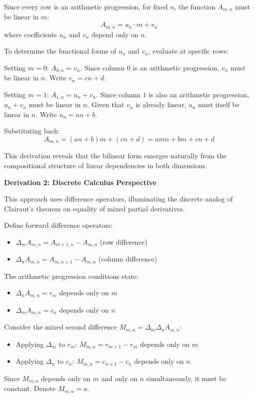 \begin{enumerate}
 Since every row is an arithmetic progression, for fixed $n$, the function $A_{m,n}$ must be linear in $m$:
 \[A_{m,n} = u_n \cdot m + v_n\]where coefficients $u_n$ and $v_n$ depend only on $n$.

 To determine the functional forms of $u_n$ and $v_n$, evaluate at specific rows:

 Setting $m = 0$: $A_{0,n} = v_n$. Since column $0$ is an arithmetic progression, $v_n$ must be linear in $n$. Write $v_n = cn + d$.

 Setting $m = 1$: $A_{1,n} = u_n + v_n$. Since column $1$ is also an arithmetic progression, $u_n + v_n$ must be linear in $n$. Given that $v_n$ is already linear, $u_n$ must itself be linear in $n$. Write $u_n = an + b$.

 Substituting back:
 \[A_{m,n} = (an + b)m + (cn + d) = amn + bm + cn + d\]

 This derivation reveals that the bilinear form emerges naturally from the compositional structure of linear dependencies in both dimensions.

 \textbf{Derivation 2: Discrete Calculus Perspective}

 This approach uses difference operators, illuminating the discrete analog of Clairaut's theorem on equality of mixed partial derivatives.

 Define forward difference operators:

 
            \begin{itemize}
        \item $\Delta_m A_{m,n} = A_{m+1,n} - A_{m,n}$ (row difference)
        \item $\Delta_n A_{m,n} = A_{m,n+1} - A_{m,n}$ (column difference)
            \end{itemize}
            The arithmetic progression conditions state:

 
            \begin{itemize}
        \item $\Delta_n A_{m,n} = r_m$ depends only on $m$
        \item $\Delta_m A_{m,n} = c_n$ depends only on $n$
            \end{itemize}
            Consider the mixed second difference $M_{m,n} = \Delta_m \Delta_n A_{m,n}$:

 
            \begin{itemize}
        \item Applying $\Delta_m$ to $r_m$: $M_{m,n} = r_{m+1} - r_m$ depends only on $m$
        \item Applying $\Delta_n$ to $c_n$: $M_{m,n} = c_{n+1} - c_n$ depends only on $n$
            \end{itemize}
            Since $M_{m,n}$ depends only on $m$ and only on $n$ simultaneously, it must be constant. Denote $M_{m,n} = a$.


\end{enumerate}
